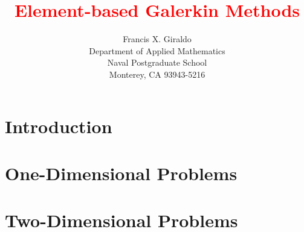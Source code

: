 \documentclass[12pt]{book}
\begin{document}
\frontmatter
\title{ \textcolor{red}{Element-based Galerkin Methods}}
\author{Francis X. Giraldo \\
Department of Applied Mathematics \\
Naval Postgraduate School \\
Monterey, CA 93943-5216}

\maketitle
\tableofcontents
\listoffigures
\listoftables

\mainmatter

\part{Introduction}







\part{One-Dimensional Problems}















\part{Two-Dimensional Problems}








\end{document}
